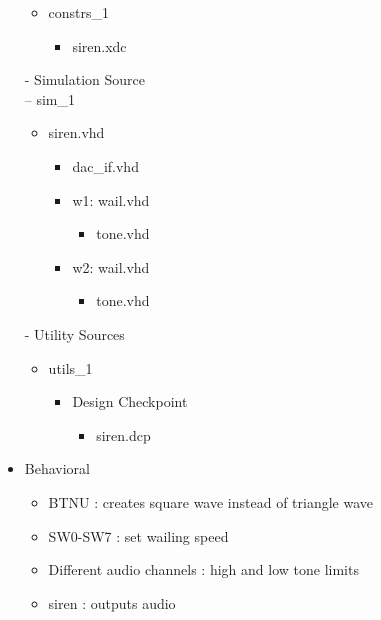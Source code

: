 \begin{itemize}
\begin{itemize}
             \item constrs\_1
             \begin{itemize}
                 \item siren.xdc
             \end{itemize}
         \end{itemize}
         - Simulation Source\\
         -- sim\_1\\
         \begin{itemize}
             \item siren.vhd
             \begin{itemize}
                 \item dac\_if.vhd
                 \item w1: wail.vhd
                 \begin{itemize}
                     \item tone.vhd
                 \end{itemize}
                 \item w2: wail.vhd
                 \begin{itemize}
                     \item tone.vhd
                 \end{itemize}
             \end{itemize}
         \end{itemize}
         - Utility Sources\\
         \begin{itemize}
             \item utils\_1
             \begin{itemize}
                 \item Design Checkpoint
                 \begin{itemize}
                     \item siren.dcp
                 \end{itemize}
             \end{itemize}
         \end{itemize}
     \item Behavioral\\
     \begin{itemize}
        \item BTNU : creates square wave instead of triangle wave
        \item SW0-SW7 : set wailing speed
        \item Different audio channels : high and low tone limits
        \item siren : outputs audio
    \end{itemize}
 \end{itemize}
